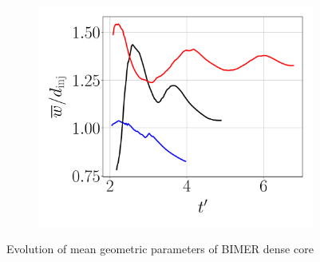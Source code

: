 \begin{figure}[ht]
\begin{subfigure}[b]{0.3\textwidth}
	\flushleft
   \includegraphics[scale=0.225]{./part3_applications/figures_ch8_resolved/results_dense_core_modeling/convergence_mean_width}
\end{subfigure}
   \caption{Evolution of mean geometric parameters of BIMER dense core}
\label{fig:BIMER_DC_mean_parameters_convergence}
\end{figure}

\clearpage

